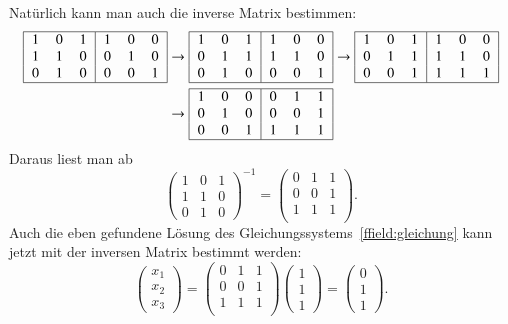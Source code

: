 Natürlich kann man auch die inverse Matrix bestimmen:
\begin{align*}
\begin{tabular}{|>{$}c<{$}>{$}c<{$}>{$}c<{$}|>{$}c<{$}>{$}c<{$}>{$}c<{$}|}
\hline
1&0&1&1&0&0\\
1&1&0&0&1&0\\
0&1&0&0&0&1\\
\hline
\end{tabular}
&
\rightarrow
\begin{tabular}{|>{$}c<{$}>{$}c<{$}>{$}c<{$}|>{$}c<{$}>{$}c<{$}>{$}c<{$}|}
\hline
1&0&1&1&0&0\\
0&1&1&1&1&0\\
0&1&0&0&0&1\\
\hline
\end{tabular}
\rightarrow
\begin{tabular}{|>{$}c<{$}>{$}c<{$}>{$}c<{$}|>{$}c<{$}>{$}c<{$}>{$}c<{$}|}
\hline
1&0&1&1&0&0\\
0&1&1&1&1&0\\
0&0&1&1&1&1\\
\hline
\end{tabular}
\\
&
\rightarrow
\begin{tabular}{|>{$}c<{$}>{$}c<{$}>{$}c<{$}|>{$}c<{$}>{$}c<{$}>{$}c<{$}|}
\hline
1&0&0&0&1&1\\
0&1&0&0&0&1\\
0&0&1&1&1&1\\
\hline
\end{tabular}
\end{align*}
Daraus liest man ab
\[
\begin{pmatrix}
1&0&1\\
1&1&0\\
0&1&0
\end{pmatrix}^{-1}
=
\begin{pmatrix}
0&1&1\\
0&0&1\\
1&1&1\\
\end{pmatrix}.
\]
Auch die eben gefundene Lösung des Gleichungssystems~\eqref{ffield:gleichung}
kann jetzt mit der inversen Matrix bestimmt werden:
\[
\begin{pmatrix}x_1\\x_2\\x_3\end{pmatrix}
=
\begin{pmatrix}
0&1&1\\
0&0&1\\
1&1&1\\
\end{pmatrix}
\begin{pmatrix}1\\1\\1\end{pmatrix}
=
\begin{pmatrix}0\\1\\1\end{pmatrix}.
\]

